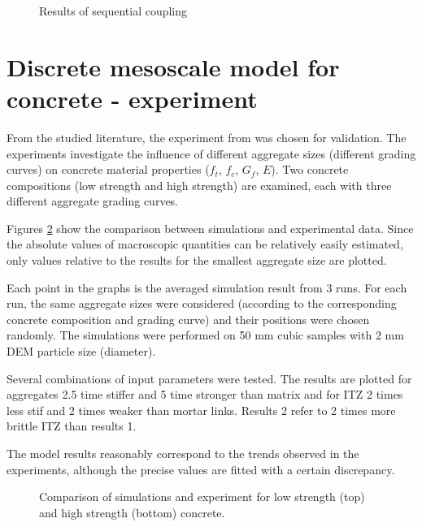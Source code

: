 \begin{figure}
	\centering
	\caption{Results of sequential coupling}
	\label{figCouplingSequantialResultsMapping}
\end{figure}







\section{Discrete mesoscale model for concrete - experiment \cite{BeygiEtAl2014a,BeygiEtAl2014b,NikbinEtAl2014a}}

From the studied literature, the experiment from \cite{BeygiEtAl2014a,BeygiEtAl2014b,NikbinEtAl2014a} was chosen for validation.
The experiments investigate the influence of different aggregate sizes (different grading curves) on concrete material properties ($f_t$, $f_c$, $G_f$, $E$).
Two concrete compositions (low strength and high strength) are examined, each with three different aggregate grading curves.

Figures \ref{figMCPMValidation} show the comparison between simulations and experimental data.
Since the absolute values of macroscopic quantities can be relatively easily estimated, only values relative to the results for the smallest aggregate size are plotted.

Each point in the graphs is the averaged simulation result from 3 runs.
For each run, the same aggregate sizes were considered (according to the corresponding concrete composition and grading curve) and their positions were chosen randomly.
The simulations were performed on 50 mm cubic samples with 2 mm DEM particle size (diameter).

Several combinations of input parameters were tested. The results are plotted for
aggregates 2.5 time stiffer and 5 time stronger than matrix
and for
ITZ 2 times less stif and 2 times weaker than mortar links.
Results 2 refer to 2 times more brittle ITZ than results 1.

The model results reasonably correspond to the trends observed in the experiments, although the precise values are fitted with a certain discrepancy.

\begin{figure}[htbp]
	\centering
	\caption[Comparison of simulations and experiment]{Comparison of simulations and experiment \cite{BeygiEtAl2014a,BeygiEtAl2014b,NikbinEtAl2014a} for low strength (top) and high strength (bottom) concrete.}
	\label{figMCPMValidation}
\end{figure}
